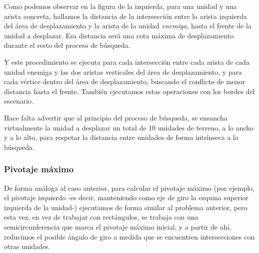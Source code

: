 \begin{minipage}[h]{0.4\columnwidth}
\centering
{}
\end{minipage}
\begin{minipage}[h]{0.6\columnwidth}
Como podemos observar en la figura de la izquierda, para una unidad y
una arista concreta, hallamos la distancia de la
intersección entre la arista izquierda del área de desplazamiento y la
arista de la unidad \emph{enemiga}, hasta el frente de la unidad a
desplazar. Esa distancia será una cota máxima de desplazamiento
durante el resto del proceso de búsqueda.

Y este procedimiento se ejecuta para cada intersección entre cada
arista de cada unidad enemiga y las dos aristas verticales del área de
desplazamiento, y para cada vértice dentro del área de desplazamiento,
buscando el conflicto de menor distancia hasta el frente. También
ejecutamos estas operaciones con los bordes del escenario.
\end{minipage}

Hace falta advertir que al principio del proceso de búsqueda, se
ensancha virtualmente la unidad a desplazar un total de 10 unidades de
terreno, a lo ancho y a
lo alto, para respetar la distancia entre unidades de forma intrínseca
a la búsqueda.

\subsubsection{Pivotaje máximo}
De forma análoga al caso anterior, para calcular el pivotaje máximo
(por ejemplo, el pivotaje izquierdo -es decir, manteniendo como eje de
giro la esquina superior izquierda de la unidad-) ejecutamos de forma
similar al problema anterior, pero esta vez, en vez de trabajar con rectángulos, se trabaja
con una semicircunferencia que marca el pivotaje máximo inicial, y a
partir de ahí, reducimos el posible ángulo de giro a medida que se
encuentren intersecciones con otras unidades.

